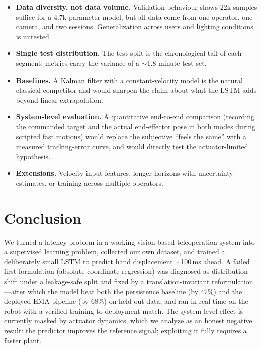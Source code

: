 \documentclass[11pt,a4paper]{article}
\begin{document}
\begin{itemize}
  \item \textbf{Data diversity, not data volume.} Validation behaviour shows
        22k samples suffice for a 4.7k-parameter model, but all data come from
        one operator, one camera, and two sessions. Generalization across
        users and lighting conditions is untested.
  \item \textbf{Single test distribution.} The test split is the chronological
        tail of each segment; metrics carry the variance of a $\sim$1.8-minute
        test set.
  \item \textbf{Baselines.} A Kalman filter with a constant-velocity model is
        the natural classical competitor and would sharpen the claim about
        what the LSTM adds beyond linear extrapolation.
  \item \textbf{System-level evaluation.} A quantitative end-to-end comparison
        (recording the commanded target and the actual end-effector pose in
        both modes during scripted fast motions) would replace the subjective
        ``feels the same'' with a measured tracking-error curve, and would
        directly test the actuator-limited hypothesis.
  \item \textbf{Extensions.} Velocity input features, longer horizons with
        uncertainty estimates, or training across multiple operators.
\end{itemize}

\section{Conclusion}

We turned a latency problem in a working vision-based teleoperation system
into a supervised learning problem, collected our own dataset, and trained a
deliberately small LSTM to predict hand displacement $\sim$100\,ms ahead. A
failed first formulation (absolute-coordinate regression) was diagnosed as
distribution shift under a leakage-safe split and fixed by a
translation-invariant reformulation---after which the model beat both the
persistence baseline (by 47\%) and the deployed EMA pipeline (by 68\%) on
held-out data, and ran in real time on the robot with a verified
training-to-deployment match. The system-level effect is currently masked by
actuator dynamics, which we analyze as an honest negative result: the
predictor improves the reference signal; exploiting it fully requires a faster
plant.

\appendix
\end{document}
